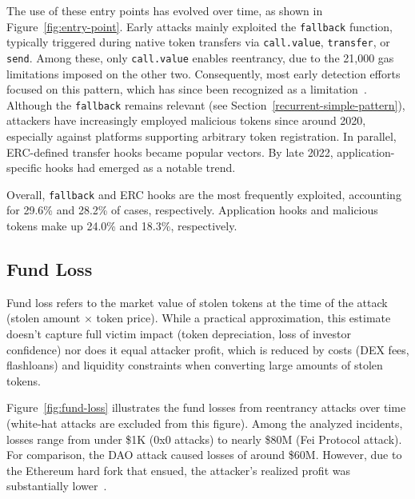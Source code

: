 The use of these entry points has evolved over time, as shown in Figure~\ref{fig:entry-point}. Early attacks mainly exploited the \lstinline{fallback} function, typically triggered during native token transfers via \lstinline{call.value}, \lstinline{transfer}, or \lstinline{send}. Among these, only \lstinline{call.value} enables reentrancy, due to the 21,000 gas limitations imposed on the other two. Consequently, most early detection efforts focused on this pattern, which has since been recognized as a limitation~\cite{turn-the-rudder,attack-contract-detection}.
%
Although the \lstinline{fallback} remains relevant (see Section~\ref{recurrent-simple-pattern}), attackers have increasingly employed malicious tokens since around 2020, especially against platforms supporting arbitrary token registration. In parallel, ERC-defined transfer hooks became popular vectors. By late 2022, application-specific hooks had emerged as a notable trend.

Overall, \lstinline{fallback} and ERC hooks are the most frequently exploited, accounting for 29.6\% and 28.2\% of cases, respectively. Application hooks and malicious tokens make up 24.0\% and 18.3\%, respectively.



\subsection{Fund Loss}
\label{quantitative:fund-loss}

Fund loss refers to the market value of stolen tokens at the time of the attack (stolen amount $\times$ token price). While a practical approximation, this estimate doesn't capture full victim impact (\eg token depreciation, loss of investor confidence) nor does it equal attacker profit, which is reduced by costs (\eg DEX fees, flashloans) and liquidity constraints when converting large amounts of stolen tokens.


Figure~\ref{fig:fund-loss} illustrates the fund losses from reentrancy attacks over time (white-hat attacks are excluded from this figure). Among the analyzed incidents, losses range from under \$1K (0x0 attacks) to nearly \$80M (Fei Protocol attack). For comparison, the DAO attack caused losses of around \$60M. However, due to the Ethereum hard fork that ensued, the attacker's realized profit was substantially lower~\cite{the-dao-analysis}.

